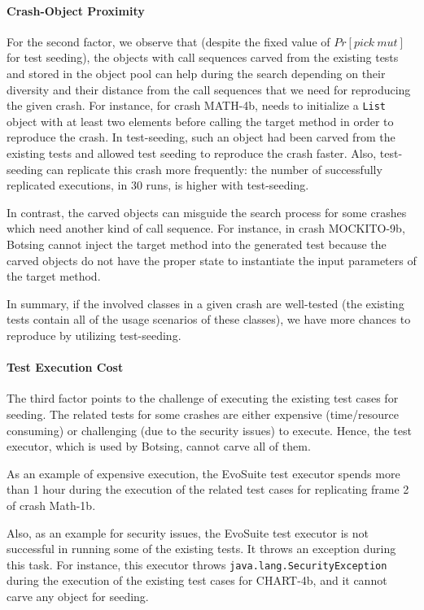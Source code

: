 \paragraph{Crash-Object Proximity} For the second factor, we observe that (despite the fixed value of $Pr[pick\ mut]$ for test seeding), the objects with call sequences carved from the existing tests and stored in the object pool can help during the search depending on their diversity and their distance from the call sequences that we need for reproducing the given crash. For instance, for crash MATH-4b, \botsing needs to initialize a \texttt{List} object with at least two elements before calling the target method in order to reproduce the crash. In test-seeding, such an object had been carved from the existing tests and allowed test seeding to reproduce the crash faster. Also, test-seeding can replicate this crash more frequently: the number of successfully replicated executions, in 30 runs, is higher with test-seeding.

In contrast, the carved objects can misguide the search process for some crashes which need another kind of call sequence.  For instance, in crash MOCKITO-9b, Botsing cannot inject the target method into the generated test because the carved objects do not have the proper state to instantiate the input parameters of the target method.

In summary, if the involved classes in a given crash are well-tested (the existing tests contain all of the usage scenarios of these classes), we have more chances to reproduce by utilizing test-seeding.


\paragraph{Test Execution Cost} The third factor points to the challenge of executing the existing test cases for seeding. The related tests for some crashes are either expensive (time/resource consuming) or challenging (due to the security issues) to execute. Hence, the \evosuite test executor, which is used by Botsing, cannot carve all of them. 

As an example of expensive execution, the EvoSuite test executor spends more than 1 hour during the execution of the related test cases for replicating frame 2 of crash Math-1b.

Also, as an example for security issues, the EvoSuite test executor is not successful in running some of the existing tests. It throws an exception during this task. For instance, this executor throws \texttt{java.lang.SecurityException} during the execution of the existing test cases for CHART-4b, and it cannot carve any object for seeding.

